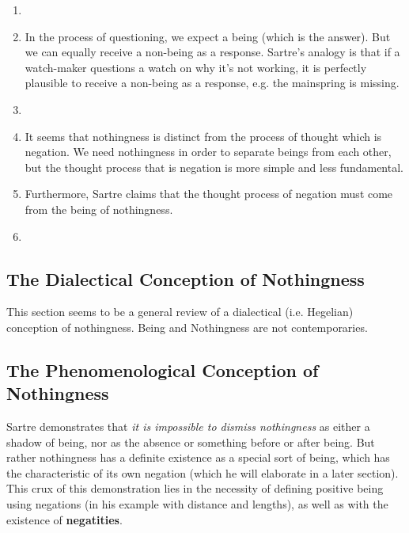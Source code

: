 \begin{enumerate}
  \item {}
  \item In the process of questioning, we expect a being (which is the answer). But we can equally receive a non-being as a response. Sartre's analogy is that if a watch-maker questions a watch on why it's not working, it is perfectly plausible to receive a non-being as a response, e.g. the mainspring is missing.
  \item {} 
  \item It seems that nothingness is distinct from the process of thought which is negation. We need nothingness in order to separate beings from each other, but the thought process that is negation is more simple and less fundamental.
  \item Furthermore, Sartre claims that the thought process of negation must come from the being of nothingness.
  \item {}
\end{enumerate}

\subsection{The Dialectical Conception of Nothingness}
This section seems to be a general review of a dialectical (i.e. Hegelian) conception of nothingness. Being and Nothingness are not contemporaries.

\subsection{The Phenomenological Conception of Nothingness}

Sartre demonstrates that \emph{it is impossible to dismiss nothingness} as either a shadow of being, nor as the absence or something before or after being. But rather nothingness has a definite existence as a special sort of being, which has the characteristic of its own negation (which he will elaborate in a later section). This crux of this demonstration lies in the necessity of defining positive being using negations (in his example with distance and lengths), as well as with the existence of \textbf{negatities}.

